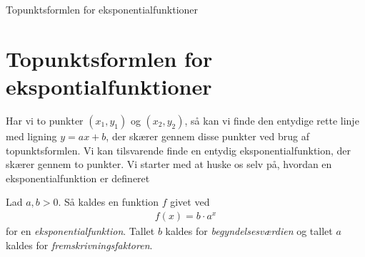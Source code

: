 

\begin{center}
\Huge
Topunktsformlen for eksponentialfunktioner
\end{center}
\section*{Topunktsformlen for ekspontialfunktioner}
Har vi to punkter $(x_1,y_1)$ og $(x_2,y_2)$, så kan vi finde den entydige rette linje med ligning $y = ax + b$, der skærer gennem disse punkter ved brug af topunktsformlen. 
Vi kan tilsvarende finde en entydig eksponentialfunktion, der skærer gennem to punkter.
Vi starter med at huske os selv på, hvordan en eksponentialfunktion er defineret
\begin{defn}[Eksponentialfunktion]
	Lad $a,b>0$. Så kaldes en funktion $f$ givet ved
	\begin{align*}
		f(x)=b\cdot a^x
	\end{align*}
	for en \textit{eksponentialfunktion}. Tallet $b$ kaldes for \textit{begyndelsesværdien} og tallet $a$ kaldes for \textit{fremskrivningsfaktoren}.
\end{defn}

